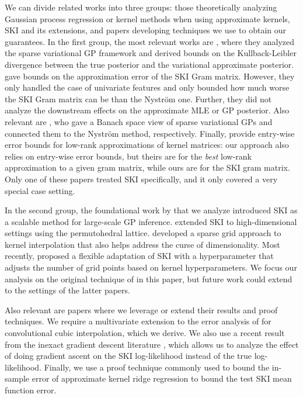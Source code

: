 We can divide related works into three groups: those theoretically analyzing Gaussian process regression or kernel methods when using approximate kernels, SKI and its extensions, and papers developing techniques we use to obtain our guarantees. In the first group, the most relevant works are \cite{burt2019rates,burt2020convergence}, where they analyzed the sparse variational GP framework \citep{titsias2009variational,hensman2013gaussian} and derived bounds on the Kullback-Leibler divergence between the true posterior and the variational approximate posterior. \cite{moreno2023ski} gave bounds on the approximation error of the SKI Gram matrix. However, they only handled the case of univariate features and only bounded how much worse the SKI Gram matrix can be than the Nystr{\"o}m one. Further, they did not analyze the downstream effects on the approximate MLE or GP posterior. Also relevant are \cite{wynne2022variational,wild2021connections}, who gave a Banach space view of sparse variational GPs and connected them to the Nystr{\"o}m method, respectively. Finally, \cite{modell2024entrywise} provide entry-wise error bounds for low-rank approximations of kernel matrices: our approach also relies on entry-wise error bounds, but theirs are for the \textit{best} low-rank approximation to a given gram matrix, while ours are for the SKI gram matrix. Only one of these papers \cite{moreno2023ski} treated SKI specifically, and it only covered a very special case setting.

In the second group, the foundational work by \cite{wilson2015kernel} that we analyze introduced SKI as a scalable method for large-scale GP inference. \cite{kapoor2021skiing} extended SKI to high-dimensional settings using the permutohedral lattice. \cite{yadav2022kernel} developed a sparse grid approach to kernel interpolation that also helps address the curse of dimensionality. Most recently, \cite{ban2024malleable} proposed a flexible adaptation of SKI with a hyperparameter that adjusts the number of grid points based on kernel hyperparameters. We focus our analysis on the original technique of \cite{wilson2015kernel} in this paper, but future work could extend to the settings of the latter papers.

Also relevant are papers where we leverage or extend their results and proof techniques. We require a multivariate extension to the error analysis of \cite{keys1981cubic} for convolutional cubic interpolation, which we derive. We also use a recent result from the inexact gradient descent literature \cite{stonyakin2023stopping}, which allows us to analyze the effect of doing gradient ascent on the SKI log-likelihood instead of the true log-likelihood. Finally, we use a proof technique \cite{bach2013sharp,musco2017recursive} commonly used to bound the in-sample error of approximate kernel ridge regression to bound the test SKI mean function error.

